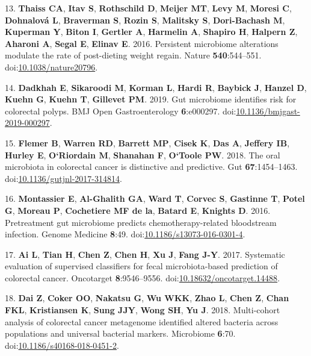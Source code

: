 \documentclass[
  11pt,
]{article}
\begin{document}
\leavevmode\hypertarget{ref-thaiss_persistent_2016}{}%
13. \textbf{Thaiss CA}, \textbf{Itav S}, \textbf{Rothschild D},
\textbf{Meijer MT}, \textbf{Levy M}, \textbf{Moresi C},
\textbf{Dohnalová L}, \textbf{Braverman S}, \textbf{Rozin S},
\textbf{Malitsky S}, \textbf{Dori-Bachash M}, \textbf{Kuperman Y},
\textbf{Biton I}, \textbf{Gertler A}, \textbf{Harmelin A},
\textbf{Shapiro H}, \textbf{Halpern Z}, \textbf{Aharoni A},
\textbf{Segal E}, \textbf{Elinav E}. 2016. Persistent microbiome
alterations modulate the rate of post-dieting weight regain. Nature
\textbf{540}:544--551.
doi:\href{https://doi.org/10.1038/nature20796}{10.1038/nature20796}.

\leavevmode\hypertarget{ref-dadkhah_gut_2019}{}%
14. \textbf{Dadkhah E}, \textbf{Sikaroodi M}, \textbf{Korman L},
\textbf{Hardi R}, \textbf{Baybick J}, \textbf{Hanzel D}, \textbf{Kuehn
G}, \textbf{Kuehn T}, \textbf{Gillevet PM}. 2019. Gut microbiome
identifies risk for colorectal polyps. BMJ Open Gastroenterology
\textbf{6}:e000297.
doi:\href{https://doi.org/10.1136/bmjgast-2019-000297}{10.1136/bmjgast-2019-000297}.

\leavevmode\hypertarget{ref-flemer_oral_2018}{}%
15. \textbf{Flemer B}, \textbf{Warren RD}, \textbf{Barrett MP},
\textbf{Cisek K}, \textbf{Das A}, \textbf{Jeffery IB}, \textbf{Hurley
E}, \textbf{O`Riordain M}, \textbf{Shanahan F}, \textbf{O`Toole PW}.
2018. The oral microbiota in colorectal cancer is distinctive and
predictive. Gut \textbf{67}:1454--1463.
doi:\href{https://doi.org/10.1136/gutjnl-2017-314814}{10.1136/gutjnl-2017-314814}.

\leavevmode\hypertarget{ref-montassier_pretreatment_2016}{}%
16. \textbf{Montassier E}, \textbf{Al-Ghalith GA}, \textbf{Ward T},
\textbf{Corvec S}, \textbf{Gastinne T}, \textbf{Potel G}, \textbf{Moreau
P}, \textbf{Cochetiere MF de la}, \textbf{Batard E}, \textbf{Knights D}.
2016. Pretreatment gut microbiome predicts chemotherapy-related
bloodstream infection. Genome Medicine \textbf{8}:49.
doi:\href{https://doi.org/10.1186/s13073-016-0301-4}{10.1186/s13073-016-0301-4}.

\leavevmode\hypertarget{ref-ai_systematic_2017}{}%
17. \textbf{Ai L}, \textbf{Tian H}, \textbf{Chen Z}, \textbf{Chen H},
\textbf{Xu J}, \textbf{Fang J-Y}. 2017. Systematic evaluation of
supervised classifiers for fecal microbiota-based prediction of
colorectal cancer. Oncotarget \textbf{8}:9546--9556.
doi:\href{https://doi.org/10.18632/oncotarget.14488}{10.18632/oncotarget.14488}.

\leavevmode\hypertarget{ref-dai_multi-cohort_2018}{}%
18. \textbf{Dai Z}, \textbf{Coker OO}, \textbf{Nakatsu G}, \textbf{Wu
WKK}, \textbf{Zhao L}, \textbf{Chen Z}, \textbf{Chan FKL},
\textbf{Kristiansen K}, \textbf{Sung JJY}, \textbf{Wong SH}, \textbf{Yu
J}. 2018. Multi-cohort analysis of colorectal cancer metagenome
identified altered bacteria across populations and universal bacterial
markers. Microbiome \textbf{6}:70.
doi:\href{https://doi.org/10.1186/s40168-018-0451-2}{10.1186/s40168-018-0451-2}.
\end{document}
